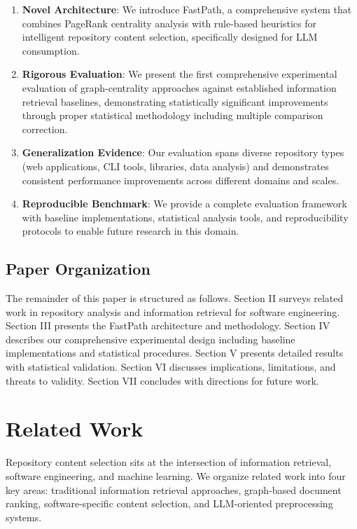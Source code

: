 \documentclass[conference]{IEEEtran}
\begin{document}
\begin{enumerate}
\item \textbf{Novel Architecture}: We introduce FastPath, a comprehensive system that combines PageRank centrality analysis with rule-based heuristics for intelligent repository content selection, specifically designed for LLM consumption.

\item \textbf{Rigorous Evaluation}: We present the first comprehensive experimental evaluation of graph-centrality approaches against established information retrieval baselines, demonstrating statistically significant improvements through proper statistical methodology including multiple comparison correction.

\item \textbf{Generalization Evidence}: Our evaluation spans diverse repository types (web applications, CLI tools, libraries, data analysis) and demonstrates consistent performance improvements across different domains and scales.

\item \textbf{Reproducible Benchmark}: We provide a complete evaluation framework with baseline implementations, statistical analysis tools, and reproducibility protocols to enable future research in this domain.
\end{enumerate}

\subsection{Paper Organization}

The remainder of this paper is structured as follows. Section II surveys related work in repository analysis and information retrieval for software engineering. Section III presents the FastPath architecture and methodology. Section IV describes our comprehensive experimental design including baseline implementations and statistical procedures. Section V presents detailed results with statistical validation. Section VI discusses implications, limitations, and threats to validity. Section VII concludes with directions for future work.

\section{Related Work}

Repository content selection sits at the intersection of information retrieval, software engineering, and machine learning. We organize related work into four key areas: traditional information retrieval approaches, graph-based document ranking, software-specific content selection, and LLM-oriented preprocessing systems.
\end{document}
